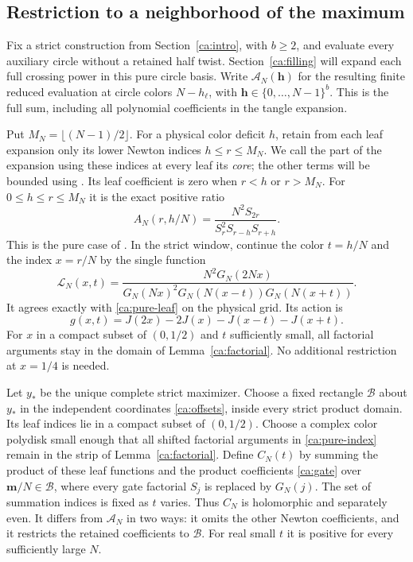 \subsection{Restriction to a neighborhood of the maximum}
\label{ca:strict-pure-section}

Fix a strict construction from Section~\ref{ca:intro}, with $b\ge2$,
and evaluate every auxiliary circle without a retained half twist.
Section~\ref{ca:filling} will expand each full crossing power in this
pure circle basis. Write $\mathcal A_N(\mathbf h)$ for the resulting
finite reduced evaluation at circle colors $N-h_\ell$, with
$\mathbf h\in\{0,\ldots,N-1\}^b$. This is the full sum, including
all polynomial coefficients in the tangle expansion.

Put $M_N=\lfloor(N-1)/2\rfloor$. For a physical color deficit $h$,
retain from each leaf expansion only its lower Newton indices
$h\le r\le M_N$. We call the part of the expansion using these
indices at every leaf its \emph{core}; the other terms will be bounded
using \cite{Bounds}. Its leaf coefficient is zero when $r<h$ or
$r>M_N$.
For $0\le h\le r\le M_N$ it is the exact positive ratio
\begin{equation}\label{ca:pure-leaf}
 A_N(r,h/N)=
 \frac{N^2S_{2r}}{S_r^2S_{r-h}S_{r+h}}.
\end{equation}
This is the pure case of \cite[Proposition 4.1]{Newton}.
In the strict window, continue the color $t=h/N$ and the index
$x=r/N$ by the single function
\begin{equation}\label{ca:pure-index}
 \mathscr L_N(x,t)=
 \frac{N^2G_N(2Nx)}
 {G_N(Nx)^2G_N(N(x-t))G_N(N(x+t))}.
\end{equation}
It agrees exactly with \eqref{ca:pure-leaf} on the physical grid.
Its action is
\[
 g(x,t)=J(2x)-2J(x)-J(x-t)-J(x+t).
\]
For $x$ in a compact subset of $(0,1/2)$ and $t$ sufficiently small,
all factorial arguments stay in the domain of Lemma~\ref{ca:factorial}.
No additional restriction at $x=1/4$ is needed.

Let $y_*$ be the unique complete strict maximizer. Choose a fixed
rectangle $\mathcal B$ about $y_*$ in the independent coordinates
\eqref{ca:offsets}, inside every strict product domain. Its leaf indices
lie in a compact subset of $(0,1/2)$. Choose a complex color polydisk
small enough that all shifted factorial arguments in
\eqref{ca:pure-index} remain in the strip of Lemma~\ref{ca:factorial}.
Define $C_N(t)$ by summing the product of these leaf functions and
the product coefficients \eqref{ca:gate} over
$\mathbf m/N\in\mathcal B$,
where every gate factorial $S_j$ is replaced by $G_N(j)$.
The set of summation indices is fixed as $t$ varies. Thus $C_N$
is holomorphic and separately even. It differs from $\mathcal A_N$
in two ways: it omits the other Newton coefficients, and it restricts
the retained coefficients to $\mathcal B$. For real small $t$
it is positive for every sufficiently large $N$.

